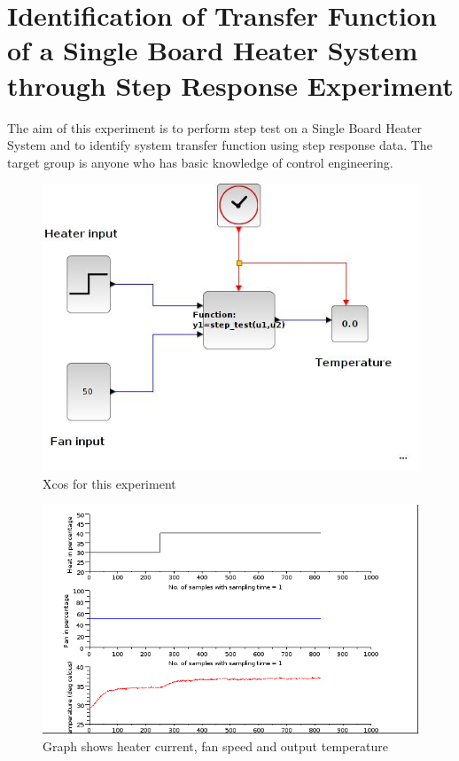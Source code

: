 \chapter{Identification of Transfer Function of a Single Board Heater System through Step Response Experiment}\label{chap1}
The aim of this experiment is to perform step test on a Single Board Heater System and to identify system transfer 
function using step response data. The target group is anyone who has basic knowledge of control engineering.

\begin{figure}
\centering
\includegraphics[width=\linewidth]{Step-test_manual/step_xcos.jpg}
\caption{Xcos for this experiment}
\label{xcos_st}
\end{figure}

\begin{figure}
\centering
\includegraphics[width=\linewidth]{Step-test_manual/ste-test.png}
\caption{Graph shows heater current, fan speed and output temperature}
\label{fig:scope_st}
\end{figure}

